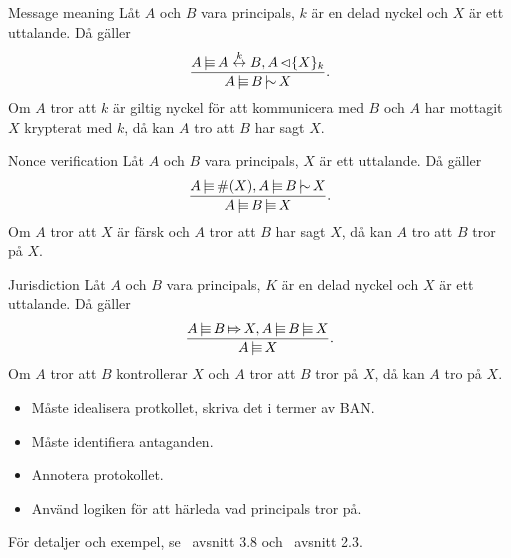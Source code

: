 \begin{frame}
  \begin{axiom}{Message meaning}
    Låt \(A\) och \(B\) vara principals, \(k\) är en delad nyckel och \(X\) är 
    ett uttalande.
    Då gäller
    \begin{align*}
      \frac{A\believes A\share{k} B, A\sees \encrypt{X}{k}}%
        {A\believes B\said X}.
    \end{align*}
    Om \(A\) tror att \(k\) är giltig nyckel för att kommunicera med \(B\) och 
    \(A\) har mottagit \(X\) krypterat med \(k\),
    då kan \(A\) tro att \(B\) har sagt \(X\).
  \end{axiom}
\end{frame}

\begin{frame}
  \begin{axiom}{Nonce verification}
    Låt \(A\) och \(B\) vara principals, \(X\) är ett uttalande.
    Då gäller
    \begin{align*}
      \frac{A\believes \fresh X, A\believes B\said X}%
        {A\believes B\believes X}.
    \end{align*}
    Om \(A\) tror att \(X\) är färsk och \(A\) tror att \(B\) har sagt \(X\),
    då kan \(A\) tro att \(B\) tror på \(X\).
  \end{axiom}
\end{frame}

\begin{frame}
  \begin{axiom}{Jurisdiction}
    Låt \(A\) och \(B\) vara principals, \(K\) är en delad nyckel och \(X\) är 
    ett uttalande.
    Då gäller
    \begin{align*}
      \frac{A\believes B\controls X, A\believes B\believes X}%
        {A\believes X}.
    \end{align*}
    Om \(A\) tror att \(B\) kontrollerar \(X\) och \(A\) tror att \(B\) tror på 
    \(X\),
    då kan \(A\) tro på \(X\).
  \end{axiom}
\end{frame}

\begin{frame}
  \begin{itemize}
    \item Måste idealisera protkollet, skriva det i termer av BAN\@.
    \item Måste identifiera antaganden.
    \item Annotera protokollet.
    \item Använd logiken för att härleda vad principals tror på.
  \end{itemize}
  För detaljer och exempel, se~\cite{Anderson2008sea} avsnitt 3.8 
  och~\cite{Syverson2001tlo} avsnitt 2.3.
\end{frame}

